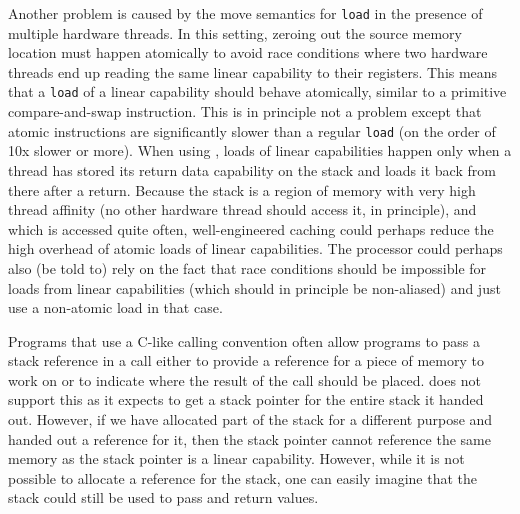 Another problem is caused by the move semantics for \texttt{load} in the presence of multiple hardware threads.
In this setting, zeroing out the source memory location must happen atomically to avoid race conditions where two hardware threads end up reading the same linear capability to their registers.
This means that a \texttt{load} of a linear capability should behave atomically, similar to a primitive compare-and-swap instruction.
This is in principle not a problem except that atomic instructions are significantly slower than a regular \texttt{load} (on the order of 10x slower or more).
When using \stktokens{}, loads of linear capabilities happen only when a thread has stored its return data capability on the stack and loads it back from there after a return.
Because the stack is a region of memory with very high thread affinity (no other hardware thread should access it, in principle), and which is accessed quite often, well-engineered caching could perhaps reduce the high overhead of atomic loads of linear capabilities.
The processor could perhaps also (be told to) rely on the fact that race conditions should be impossible for loads from linear capabilities (which should in principle be non-aliased) and just use a non-atomic load in that case.

\begin{jversion}
Programs that use a C-like calling convention often allow programs to pass a stack reference in a call either to provide a reference for a piece of memory to work on or to indicate where the result of the call should be placed.
\stktokens{} does not support this as it expects to get a stack pointer for the entire stack it handed out.
However, if we have allocated part of the stack for a different purpose and handed out a reference for it, then the stack pointer cannot reference the same memory as the stack pointer is a linear capability.
However, while it is not possible to allocate a reference for the stack, one can easily imagine that the stack could still be used to pass and return values.
\end{jversion}

